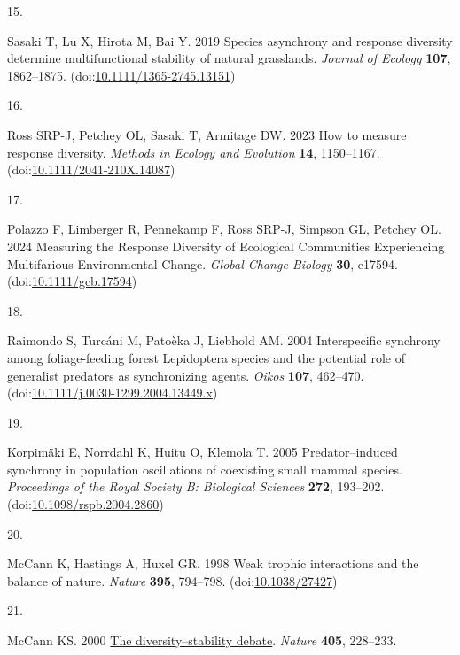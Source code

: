 \documentclass[
]{article}
\newlength{\cslhangindent}
\newlength{\csllabelwidth}
\newlength{\cslentryspacingunit} %
\newenvironment{CSLReferences}[2] %
 {%
  \setlength{\parindent}{0pt}
  \ifodd #1
  \let\oldpar\par
  \def\par{\hangindent=\cslhangindent\oldpar}
  \fi
  \setlength{\parskip}{#2\cslentryspacingunit}
 }%
 {}
\newcommand{\CSLLeftMargin}[1]{\parbox[t]{\csllabelwidth}{#1}}
\newcommand{\CSLRightInline}[1]{\parbox[t]{\linewidth - \csllabelwidth}{#1}\break}
\begin{document}
\begin{CSLReferences}{0}{0}
\leavevmode{}%
\CSLLeftMargin{15. }%
\CSLRightInline{Sasaki T, Lu X, Hirota M, Bai Y. 2019 Species asynchrony and response diversity determine multifunctional stability of natural grasslands. \emph{Journal of Ecology} \textbf{107}, 1862--1875. (doi:\href{https://doi.org/10.1111/1365-2745.13151}{10.1111/1365-2745.13151})}

\leavevmode{}%
\CSLLeftMargin{16. }%
\CSLRightInline{Ross SRP-J, Petchey OL, Sasaki T, Armitage DW. 2023 How to measure response diversity. \emph{Methods in Ecology and Evolution} \textbf{14}, 1150--1167. (doi:\href{https://doi.org/10.1111/2041-210X.14087}{10.1111/2041-210X.14087})}

\leavevmode{}%
\CSLLeftMargin{17. }%
\CSLRightInline{Polazzo F, Limberger R, Pennekamp F, Ross SRP-J, Simpson GL, Petchey OL. 2024 Measuring the {Response} {Diversity} of {Ecological} {Communities} {Experiencing} {Multifarious} {Environmental} {Change}. \emph{Global Change Biology} \textbf{30}, e17594. (doi:\href{https://doi.org/10.1111/gcb.17594}{10.1111/gcb.17594})}

\leavevmode{}%
\CSLLeftMargin{18. }%
\CSLRightInline{Raimondo S, Turcáni M, Patoèka J, Liebhold AM. 2004 Interspecific synchrony among foliage-feeding forest {Lepidoptera} species and the potential role of generalist predators as synchronizing agents. \emph{Oikos} \textbf{107}, 462--470. (doi:\href{https://doi.org/10.1111/j.0030-1299.2004.13449.x}{10.1111/j.0030-1299.2004.13449.x})}

\leavevmode{}%
\CSLLeftMargin{19. }%
\CSLRightInline{Korpimäki E, Norrdahl K, Huitu O, Klemola T. 2005 Predator--induced synchrony in population oscillations of coexisting small mammal species. \emph{Proceedings of the Royal Society B: Biological Sciences} \textbf{272}, 193--202. (doi:\href{https://doi.org/10.1098/rspb.2004.2860}{10.1098/rspb.2004.2860})}

\leavevmode{}%
\CSLLeftMargin{20. }%
\CSLRightInline{McCann K, Hastings A, Huxel GR. 1998 Weak trophic interactions and the balance of nature. \emph{Nature} \textbf{395}, 794--798. (doi:\href{https://doi.org/10.1038/27427}{10.1038/27427})}

\leavevmode{}%
\CSLLeftMargin{21. }%
\CSLRightInline{McCann KS. 2000 \href{https://www.nature.com/articles/35012234}{The diversity--stability debate}. \emph{Nature} \textbf{405}, 228--233.}


\end{CSLReferences}
\end{document}
